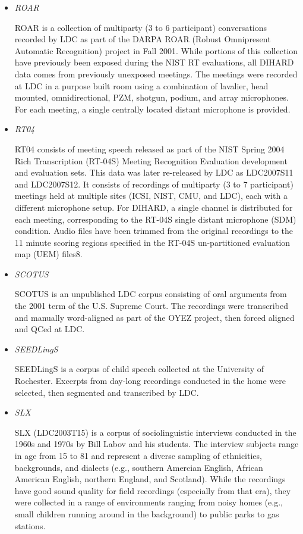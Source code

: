 \begin{itemize}
\item \emph{ROAR}

ROAR is a collection of multiparty (3 to 6 participant) conversations recorded by LDC as part of the DARPA ROAR (Robust Omnipresent Automatic Recognition) project in Fall 2001. While portions of this collection have previously been exposed during the NIST RT evaluations, all DIHARD data comes from previously unexposed meetings. The meetings were recorded at LDC in a purpose built room using a combination of lavalier, head mounted, omnidirectional, PZM, shotgun, podium, and array microphones. For each meeting, a single centrally located distant microphone is provided.

\item \emph{RT04}

RT04 consists of meeting speech released as part of the NIST Spring 2004 Rich Transcription (RT-04S) Meeting Recognition Evaluation development and evaluation sets. This data was later re-released by LDC as LDC2007S11 and LDC2007S12. It consists of recordings of multiparty (3 to 7 participant) meetings held at multiple sites (ICSI, NIST, CMU, and LDC), each with a different microphone setup. For DIHARD, a single channel is distributed for each meeting, corresponding to the RT-04S single distant microphone (SDM) condition. Audio files have been trimmed from the original recordings to the 11 minute scoring regions specified in the RT-04S un-partitioned evaluation map (UEM) files8.

\item \emph{SCOTUS}

SCOTUS is an unpublished LDC corpus consisting of oral arguments from the 2001 term of the U.S. Supreme Court. The recordings were transcribed and manually word-aligned as part of the OYEZ project, then forced aligned and QCed at LDC.

\item \emph{SEEDLingS}

SEEDLingS is a corpus of child speech collected at the University of Rochester. Excerpts from day-long recordings conducted in the home were selected, then segmented and transcribed by LDC.

\item \emph{SLX}

SLX (LDC2003T15) is a corpus of sociolinguistic interviews conducted in the 1960s and 1970s by Bill Labov and his students. The interview subjects range in age from 15 to 81 and represent a diverse sampling of ethnicities, backgrounds, and dialects (e.g., southern Amercian English, African American English, northern England, and Scotland). While the recordings have good sound quality for field recordings (especially from that era), they were collected in a range of environments ranging from noisy homes (e.g., small children running around in the background) to public parks to gas stations.


\end{itemize}
